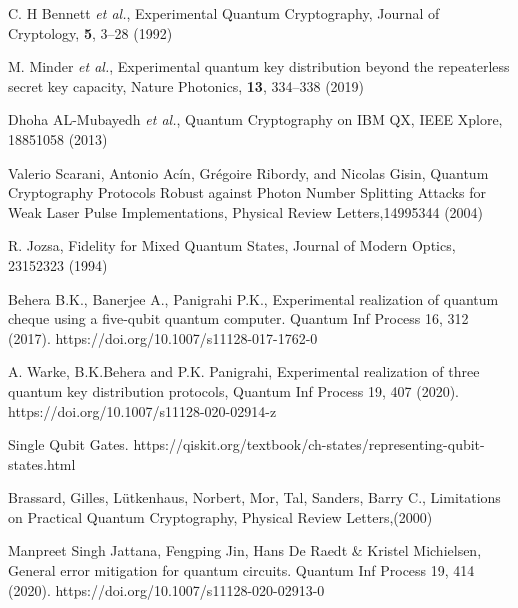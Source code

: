 \documentclass[superscriptaddress,twocolumn,showpacs,prb,floatfix]{revtex4}
\begin{document}
\begin{thebibliography}{10}
 C. H Bennett \textit{et al.}, Experimental Quantum Cryptography, Journal of Cryptology, \textbf{5}, 3–28 (1992)

 M. Minder \textit{et al.}, Experimental quantum key distribution beyond the repeaterless secret key capacity, Nature Photonics, \textbf{13}, 334–338 (2019)

 Dhoha AL-Mubayedh \textit{et al.}, Quantum Cryptography on IBM QX, IEEE Xplore, 18851058 (2013)

 Valerio Scarani, Antonio Acín, Grégoire Ribordy, and Nicolas Gisin, Quantum Cryptography Protocols Robust against Photon Number Splitting Attacks for Weak Laser Pulse Implementations, Physical Review Letters,14995344 (2004)

 R. Jozsa, Fidelity for Mixed Quantum States, Journal of Modern Optics, 23152323 (1994)

Behera B.K., Banerjee A., Panigrahi P.K., Experimental realization of quantum cheque using a five-qubit quantum computer.
Quantum Inf Process 16, 312 (2017). https://doi.org/10.1007/s11128-017-1762-0

 A. Warke, B.K.Behera and P.K. Panigrahi, Experimental realization of three quantum key distribution protocols, Quantum Inf Process 19, 407 (2020). https://doi.org/10.1007/s11128-020-02914-z

Single Qubit Gates.
https://qiskit.org/textbook/ch-states/representing-qubit-states.html

 Brassard, Gilles, Lütkenhaus, Norbert,  Mor, Tal, Sanders, Barry C., Limitations on Practical Quantum Cryptography, Physical Review Letters,(2000)

 Manpreet Singh Jattana, Fengping Jin, Hans De Raedt \& Kristel Michielsen, General error mitigation for quantum circuits. Quantum Inf Process 19, 414 (2020). https://doi.org/10.1007/s11128-020-02913-0


\end{thebibliography}
\end{document}
